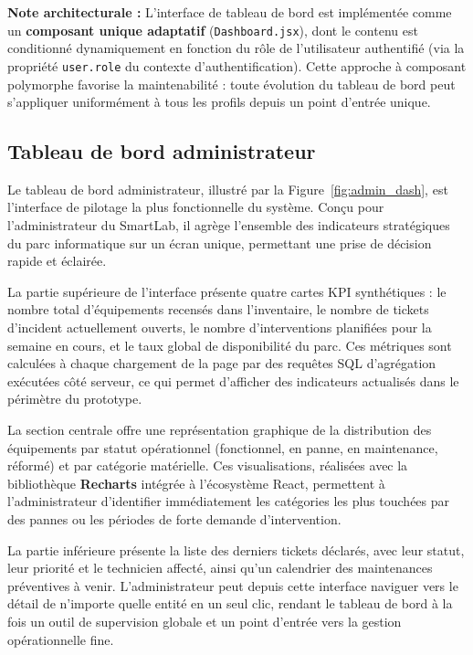 \textbf{Note architecturale :} L'interface de tableau de bord est implémentée comme un \textbf{composant unique adaptatif} (\texttt{Dashboard.jsx}), dont le contenu est conditionné dynamiquement en fonction du rôle de l'utilisateur authentifié (via la propriété \texttt{user.role} du contexte d'authentification). Cette approche à composant polymorphe favorise la maintenabilité : toute évolution du tableau de bord peut s'appliquer uniformément à tous les profils depuis un point d'entrée unique.

\subsection{Tableau de bord administrateur}

Le tableau de bord administrateur, illustré par la Figure~\ref{fig:admin_dash}, est l'interface de pilotage la plus fonctionnelle du système. Conçu pour l'administrateur du SmartLab, il agrège l'ensemble des indicateurs stratégiques du parc informatique sur un écran unique, permettant une prise de décision rapide et éclairée.

La partie supérieure de l'interface présente quatre cartes KPI synthétiques : le nombre total d'équipements recensés dans l'inventaire, le nombre de tickets d'incident actuellement ouverts, le nombre d'interventions planifiées pour la semaine en cours, et le taux global de disponibilité du parc. Ces métriques sont calculées à chaque chargement de la page par des requêtes SQL d'agrégation exécutées côté serveur, ce qui permet d'afficher des indicateurs actualisés dans le périmètre du prototype.

La section centrale offre une représentation graphique de la distribution des équipements par statut opérationnel (fonctionnel, en panne, en maintenance, réformé) et par catégorie matérielle. Ces visualisations, réalisées avec la bibliothèque \textbf{Recharts} intégrée à l'écosystème React, permettent à l'administrateur d'identifier immédiatement les catégories les plus touchées par des pannes ou les périodes de forte demande d'intervention.

La partie inférieure présente la liste des derniers tickets déclarés, avec leur statut, leur priorité et le technicien affecté, ainsi qu'un calendrier des maintenances préventives à venir. L'administrateur peut depuis cette interface naviguer vers le détail de n'importe quelle entité en un seul clic, rendant le tableau de bord à la fois un outil de supervision globale et un point d'entrée vers la gestion opérationnelle fine.

